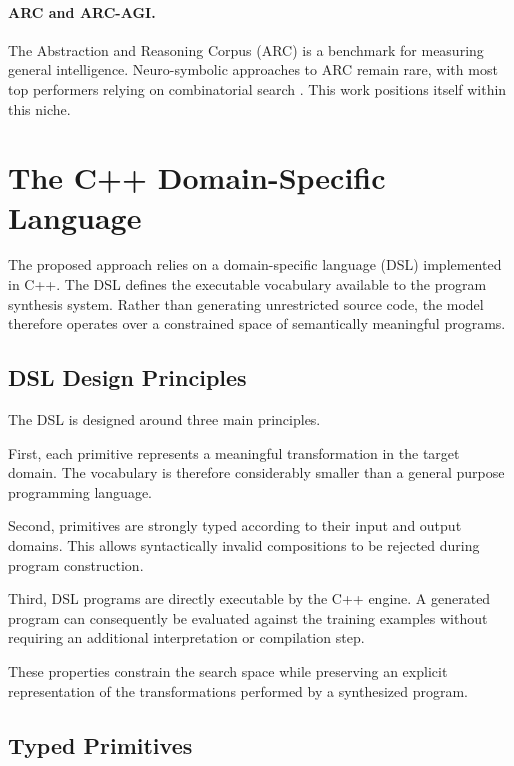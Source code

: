 \documentclass[final]{nesy2027}
\begin{document}
\paragraph{ARC and ARC-AGI.}
The Abstraction and Reasoning Corpus (ARC) \citep{chollet2019measure} is a
benchmark for measuring general intelligence.
Neuro-symbolic approaches to ARC remain rare, with most top performers relying
on combinatorial search \citep{hodel2024arc}.
This work positions itself within this niche.

\section{The C++ Domain-Specific Language}
\label{sec:dsl}

The proposed approach relies on a domain-specific language (DSL) implemented
in C++. The DSL defines the executable vocabulary available to the program
synthesis system. Rather than generating unrestricted source code, the model
therefore operates over a constrained space of semantically meaningful
programs.

\subsection{DSL Design Principles}
\label{subsec:dsl-design}

The DSL is designed around three main principles.

First, each primitive represents a meaningful transformation in the target
domain. The vocabulary is therefore considerably smaller than a general
purpose programming language.

Second, primitives are strongly typed according to their input and output
domains. This allows syntactically invalid compositions to be rejected during
program construction.

Third, DSL programs are directly executable by the C++ engine. A generated
program can consequently be evaluated against the training examples without
requiring an additional interpretation or compilation step.

These properties constrain the search space while preserving an explicit
representation of the transformations performed by a synthesized program.

\subsection{Typed Primitives}
\label{subsec:dsl-types}
\end{document}
